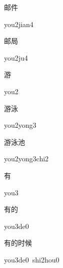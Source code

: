 \begin{verbete}{邮件}
\begin{pronuncia}{you2jian4}
\end{pronuncia}
\end{verbete}

\begin{verbete}[you2ju4]{邮局}
\begin{pronuncia}{you2ju4}
\end{pronuncia}
\end{verbete}

\begin{verbete}[you2]{游}
\begin{pronuncia}{you2}
\end{pronuncia}
\end{verbete}

\begin{verbete}{游泳}
\begin{pronuncia}{you2yong3}
\end{pronuncia}
\end{verbete}

\begin{verbete}{游泳池}
\begin{pronuncia}{you2yong3chi2}
\end{pronuncia}
\end{verbete}

\begin{verbete}[you3]{有}
\begin{pronuncia}{you3}
\end{pronuncia}
\end{verbete}

\begin{verbete}[you3de0]{有的}
\begin{pronuncia}{you3de0}
\end{pronuncia}
\end{verbete}

\begin{verbete}{有的时候}
\begin{pronuncia}{you3de0\ shi2hou0}
\end{pronuncia}
\end{verbete}

